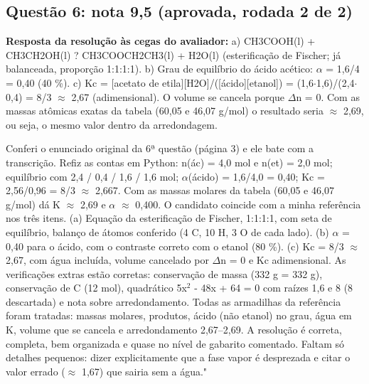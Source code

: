 \documentclass{article}%
\begin{document}
\subsection*{Questão 6: nota 9,5 (aprovada, rodada 2 de 2)}%
\textbf{Resposta da resolução às cegas do avaliador:} a) CH3COOH(l) + CH3CH2OH(l) ? CH3COOCH2CH3(l) + H2O(l) (esterificação de Fischer; já balanceada, proporção 1:1:1:1).\newline%
b) Grau de equilíbrio do ácido acético: $\alpha$ = 1,6/4 = 0,40 (40 \%).\newline%
c) Kc = {[}acetato de etila{]}{[}H2O{]}/({[}ácido{]}{[}etanol{]}) = (1,6$\cdot$1,6)/(2,4$\cdot$0,4) = 8/3 $\approx$ 2,67 (adimensional). O volume se cancela porque $\Delta$n = 0. Com as massas atômicas exatas da tabela (60,05 e 46,07 g/mol) o resultado seria $\approx$ 2,69, ou seja, o mesmo valor dentro da arredondagem.\par %
Conferi o enunciado original da 6ª questão (página 3) e ele bate com a transcrição. Refiz as contas em Python: n(ác) = 4,0 mol e n(et) = 2,0 mol; equilíbrio com 2,4 / 0,4 / 1,6 / 1,6 mol; $\alpha$(ácido) = 1,6/4,0 = 0,40; Kc = 2,56/0,96 = 8/3 $\approx$ 2,667. Com as massas molares da tabela (60,05 e 46,07 g/mol) dá K $\approx$ 2,69 e $\alpha$ $\approx$ 0,400. O candidato coincide com a minha referência nos três itens. (a) Equação da esterificação de Fischer, 1:1:1:1, com seta de equilíbrio, balanço de átomos conferido (4 C, 10 H, 3 O de cada lado). (b) $\alpha$ = 0,40 para o ácido, com o contraste correto com o etanol (80 \%). (c) Kc = 8/3 $\approx$ 2,67, com água incluída, volume cancelado por $\Delta$n = 0 e Kc adimensional. As verificações extras estão corretas: conservação de massa (332 g = 332 g), conservação de C (12 mol), quadrático 5x$^2$ - 48x + 64 = 0 com raízes 1,6 e 8 (8 descartada) e nota sobre arredondamento. Todas as armadilhas da referência foram tratadas: massas molares, produtos, ácido (não etanol) no grau, água em K, volume que se cancela e arredondamento 2,67--2,69. A resolução é correta, completa, bem organizada e quase no nível de gabarito comentado. Faltam só detalhes pequenos: dizer explicitamente que a fase vapor é desprezada e citar o valor errado ($\approx$ 1,67) que sairia sem a água."%
\end{document}
